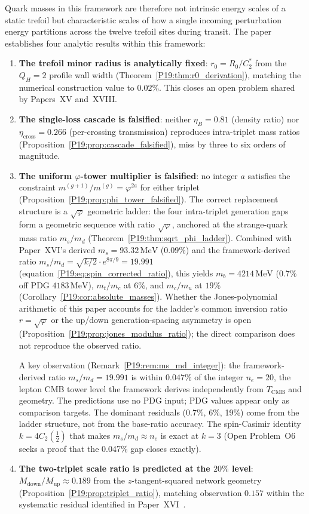 \documentclass[11pt,a4paper]{article}
\theoremstyle{definition}\newtheorem{definition}[theorem]{Definition}
\theoremstyle{remark}
\newcommand{\vp}{\varphi}
\newcommand{\QH}{Q_H}
\begin{document}
Quark masses in this framework are therefore not intrinsic energy
scales of a static trefoil but characteristic scales of how a
single incoming perturbation energy partitions across the twelve
trefoil sites during transit.  The paper establishes four
analytic results within this framework:

\begin{enumerate}[label=(\Alph*)]
\item \textbf{The trefoil minor radius is analytically fixed}:
$r_0=R_0/C_2^*$ from the $\QH=2$ profile wall width
(Theorem~\ref{P19:thm:r0_derivation}), matching the numerical
construction value to $0.02\%$.  This closes an open problem
shared by Papers~XV and~XVIII.

\item \textbf{The single-loss cascade is falsified}: neither
$\eta_B=0.81$ (density ratio) nor $\eta_{\mathrm{cross}}=0.266$
(per-crossing transmission) reproduces intra-triplet mass ratios
(Proposition~\ref{P19:prop:cascade_falsified}), miss by three to six
orders of magnitude.

\item \textbf{The uniform $\vp$-tower multiplier is falsified}:
no integer $a$ satisfies the constraint
$m^{(g+1)}/m^{(g)}=\vp^{2a}$ for either triplet
(Proposition~\ref{P19:prop:phi_tower_falsified}).  The correct
replacement structure is a $\sqrt{\vp}$ geometric ladder: the four
intra-triplet generation gaps form a geometric sequence with ratio
$\sqrt{\vp}$, anchored at the strange-quark mass ratio $m_s/m_d$
(Theorem~\ref{P19:thm:sqrt_phi_ladder}).  Combined with
Paper~XVI's derived $m_s=93.32\,\mathrm{MeV}$ ($0.09\%$) and the
framework-derived ratio $m_s/m_d=\sqrt{k/2}\cdot e^{8\pi/9}=19.991$
(equation~\eqref{P19:eq:spin_corrected_ratio}), this yields
$m_b=4214\,\mathrm{MeV}$ ($0.7\%$ off PDG $4183\,\mathrm{MeV}$),
$m_t/m_c$ at $6\%$, and $m_c/m_u$ at $19\%$
(Corollary~\ref{P19:cor:absolute_masses}).  Whether the
Jones-polynomial arithmetic of this paper accounts for the ladder's
common inversion ratio $r=\sqrt{\vp}$ or the up/down generation-spacing
asymmetry is open (Proposition~\ref{P19:prop:jones_modulus_ratio});
the direct comparison does not reproduce the observed ratio.

A key observation (Remark~\ref{P19:rem:ms_md_integer}): the
framework-derived ratio $m_s/m_d=19.991$ is within $0.047\%$ of
the integer $n_e=20$, the lepton CMB tower level the framework
derives independently from $T_{\mathrm{CMB}}$ and geometry.
The predictions use no PDG input; PDG values appear only as
comparison targets.  The dominant residuals (0.7\%, 6\%, 19\%)
come from the ladder structure, not from the base-ratio accuracy.
The spin-Casimir identity $k=4C_2(\tfrac12)$ that makes
$m_s/m_d\approx n_e$ is exact at $k=3$ (Open Problem~O6 seeks a
proof that the 0.047\% gap closes exactly).

\item \textbf{The two-triplet scale ratio is predicted at the
$20\%$ level}: $M_{\mathrm{down}}/M_{\mathrm{up}}\approx 0.189$
from the $z$-tangent-squared network geometry
(Proposition~\ref{P19:prop:triplet_ratio}), matching observation
$0.157$ within the systematic residual identified in
Paper~XVI~\cite{Paper16}.
\end{enumerate}
\end{document}
